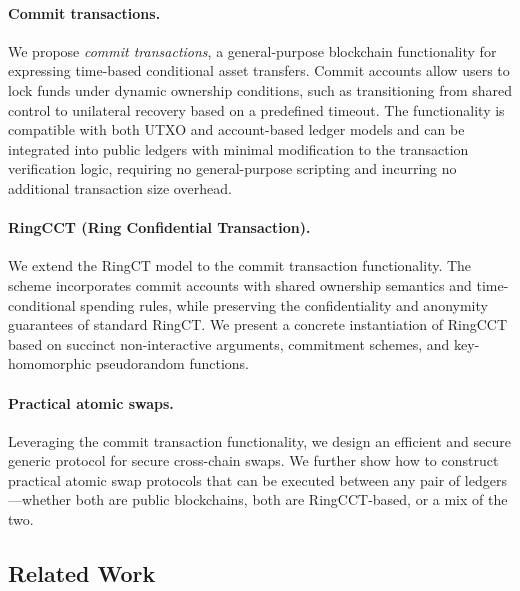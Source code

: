 \paragraph*{Commit transactions.} We propose \emph{commit transactions}, a general-purpose blockchain functionality for expressing time-based conditional asset transfers. Commit accounts allow users to lock funds under dynamic ownership conditions, such as transitioning from shared control to unilateral recovery based on a predefined timeout. The functionality is compatible with both UTXO and account-based ledger models and can be integrated into public ledgers with minimal modification to the transaction verification logic, requiring no general-purpose scripting and incurring no additional transaction size overhead.
\paragraph*{RingCCT (Ring Confidential Transaction).} We extend the RingCT model to the commit transaction functionality. The scheme incorporates commit accounts with shared ownership semantics and time-conditional spending rules, while preserving the confidentiality and anonymity guarantees of standard RingCT. We present a concrete instantiation of RingCCT based on succinct non-interactive arguments, commitment schemes, and key-homomorphic pseudorandom functions.
\paragraph*{Practical atomic swaps.} 
Leveraging the commit transaction functionality, we design an efficient and secure generic protocol for secure cross-chain swaps. We further show how to construct practical atomic swap protocols that can be executed between any pair of ledgers—whether both are public blockchains, both are RingCCT-based, or a mix of the two.


\subsection{Related Work}
